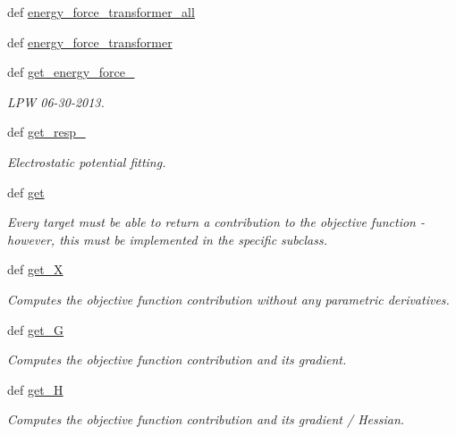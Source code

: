 \begin{DoxyCompactItemize}
\item 
def \hyperlink{classforcebalance_1_1abinitio_1_1AbInitio_a3d28520925c6dfd179647d0abf7e1368}{energy\-\_\-force\-\_\-transformer\-\_\-all}
\item 
def \hyperlink{classforcebalance_1_1abinitio_1_1AbInitio_a9167da321a9fff748eef5ebe754cc7ca}{energy\-\_\-force\-\_\-transformer}
\item 
def \hyperlink{classforcebalance_1_1abinitio_1_1AbInitio_a313c848f46579817803c8a3ff100974e}{get\-\_\-energy\-\_\-force\-\_\-}
\begin{DoxyCompactList}\small\item\em \-L\-P\-W 06-\/30-\/2013. \end{DoxyCompactList}\item 
def \hyperlink{classforcebalance_1_1abinitio_1_1AbInitio_abfe50569805218075c5942fd3be8bbe7}{get\-\_\-resp\-\_\-}
\begin{DoxyCompactList}\small\item\em \-Electrostatic potential fitting. \end{DoxyCompactList}\item 
def \hyperlink{classforcebalance_1_1abinitio_1_1AbInitio_a2bb3ed7209707f688ec8b731392466b5}{get}
\begin{DoxyCompactList}\small\item\em \-Every target must be able to return a contribution to the objective function -\/ however, this must be implemented in the specific subclass. \end{DoxyCompactList}\item 
def \hyperlink{classforcebalance_1_1target_1_1Target_a606dd136f195c267c05a2455405e5949}{get\-\_\-\-X}
\begin{DoxyCompactList}\small\item\em \-Computes the objective function contribution without any parametric derivatives. \end{DoxyCompactList}\item 
def \hyperlink{classforcebalance_1_1target_1_1Target_afa8cc38c8bba8861c072e789717aa049}{get\-\_\-\-G}
\begin{DoxyCompactList}\small\item\em \-Computes the objective function contribution and its gradient. \end{DoxyCompactList}\item 
def \hyperlink{classforcebalance_1_1target_1_1Target_a1d2ee27fe86a09769c1816af23b09adb}{get\-\_\-\-H}
\begin{DoxyCompactList}\small\item\em \-Computes the objective function contribution and its gradient / \-Hessian. \end{DoxyCompactList}\item 

\end{DoxyCompactItemize}
